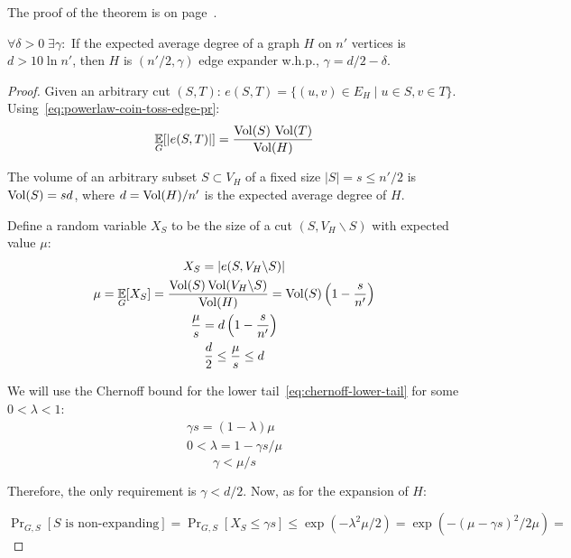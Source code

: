 The proof of the theorem is on page~\pageref*{prf:powerlaw-coin-toss-edge-expansion}.

\begin{lemma}
    \label{lem:coin-toss-lemma-d}
    $\forall\delta>0\;\exists\gamma:$
    If the expected average degree of a graph $H$ on $n'$ vertices is $d>10\ln n'$,
    then $H$ is $(n'/2,\gamma)$ edge expander w.h.p., $\gamma=d/2-\delta$.
\end{lemma}

\begin{proof}
    Given an arbitrary cut $(S,T)$: $e(S,T)=\{(u,v)\in E_H\;|\;u\in S,v\in T\}$.
    Using~\eqref{eq:powerlaw-coin-toss-edge-pr}:
    \begin{equation}
        \mathop{{}\mathbb{E}}_G[|e(S,T)|]=\frac{\operatorname*{Vol}(S)\,\operatorname*{Vol}(T)}{\operatorname*{Vol}(H)}
    \end{equation}
    
    The volume of an arbitrary subset $S\subset V_H$ of a fixed size $|S|=s\leq n'/2$
    is $\operatorname*{Vol}(S)=sd$, where $d=\operatorname*{Vol}(H)/n'$ is the expected average degree of $H$.
    
    Define a random variable $X_S$ to be the size of a cut $(S,V_H\backslash S)$ with expected value $\mu$:
    \begin{gather}
        X_S=|e(S,V_H\backslash S)|\\
        \mu=\mathop{{}\mathbb{E}}_G[X_S]=\frac{\operatorname*{Vol}(S)\operatorname*{Vol}(V_H\backslash S)}{\operatorname*{Vol}(H)}=\operatorname*{Vol}(S)\left(1-\frac{s}{n'}\right)\\
        \frac{\mu}{s}=d\left(1-\frac{s}{n'}\right)\\
        \frac{d}{2}\leq\frac{\mu}{s}\leq d
    \end{gather}
    
    We will use the Chernoff bound for the lower tail~\eqref{eq:chernoff-lower-tail}
    for some $0<\lambda<1$:
    \begin{gather*}
        \gamma s=(1-\lambda)\mu\\
        0<\lambda=1-\gamma s/\mu
    \end{gather*}
    \begin{equation}
        \label{eq:powerlaw-coin-toss-expansion-bound}
        \gamma<\mu/s
    \end{equation}
    
    Therefore, the only requirement is $\gamma<d/2$. Now, as for the expansion of $H$:
    
    $\Pr_{G,S}[S\text{ is non-expanding}]=\Pr_{G,S}[X_S\leq\gamma s]\leq \exp(-\lambda^2\mu/2)
    =\exp(-(\mu-\gamma s)^2/2\mu)=$
    

\end{proof}
